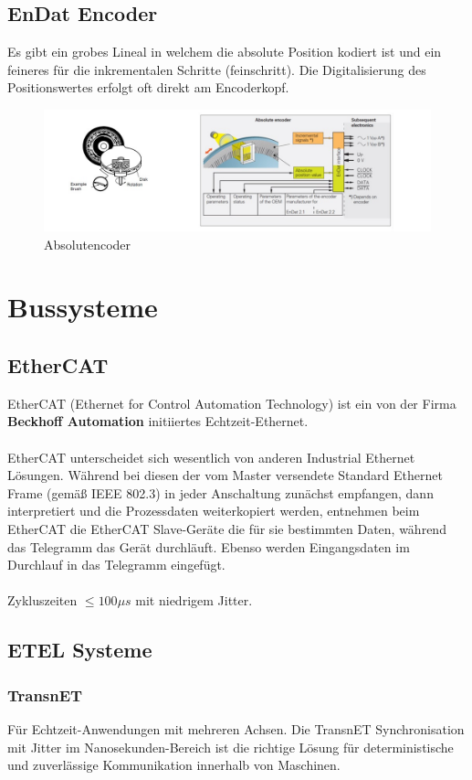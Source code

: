 	\subsection{EnDat Encoder}
		Es gibt ein grobes Lineal in welchem die absolute Position kodiert ist und ein feineres für die inkrementalen Schritte (feinschritt). Die Digitalisierung des Positionswertes erfolgt oft direkt am Encoderkopf.
		\begin{figure}
			\centering
			\includegraphics[width=\linewidth]{./pics/endat}
			\caption{Absolutencoder}
		\end{figure}
\section{Bussysteme}
	\subsection{EtherCAT}
		EtherCAT (Ethernet for Control Automation Technology) ist ein von der Firma \textbf{Beckhoff Automation} initiiertes Echtzeit-Ethernet.\\\\
		EtherCAT unterscheidet sich wesentlich von anderen Industrial Ethernet Lösungen. Während bei diesen der vom Master versendete Standard Ethernet Frame (gemäß IEEE 802.3) in jeder Anschaltung zunächst empfangen, dann interpretiert und die Prozessdaten weiterkopiert werden, entnehmen beim EtherCAT die EtherCAT Slave-Geräte die für sie bestimmten Daten, während das Telegramm das Gerät durchläuft. Ebenso werden Eingangsdaten im Durchlauf in das Telegramm eingefügt.\\\\
		Zykluszeiten $ \leq 100 \mu s $ mit niedrigem Jitter.
	\subsection{ETEL Systeme}
		\subsubsection{TransnET}
			Für Echtzeit-Anwendungen mit mehreren Achsen. Die TransnET Synchronisation mit Jitter im Nanosekunden-Bereich ist die richtige Lösung für deterministische und zuverlässige Kommunikation innerhalb von Maschinen.
